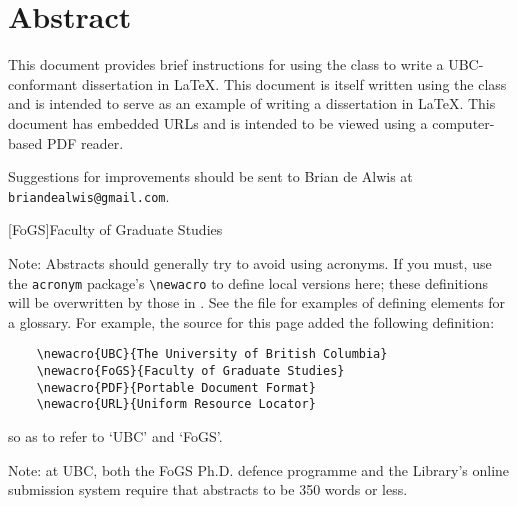 \chapter{Abstract}

This document provides brief instructions for using the 
class to write a \acs{UBC}-conformant dissertation in \LaTeX.  This
document is itself written using the  class and is
intended to serve as an example of writing a dissertation in \LaTeX.
This document has embedded \acp{URL} and is intended to be viewed
using a computer-based \ac{PDF} reader.

Suggestions for improvements should be sent to Brian de Alwis at
\texttt{briandealwis@gmail.com}.

[FoGS]{Faculty of Graduate Studies}

Note: Abstracts should generally try to avoid using acronyms.  If you
must, use the \verb+acronym+ package's \verb+\newacro+ to define
local versions here; these definitions will be overwritten by those
in .  See the  file for
examples of defining elements for a glossary.
For example, the source for this page added the following definition:
\begin{verbatim}
    \newacro{UBC}{The University of British Columbia}
    \newacro{FoGS}{Faculty of Graduate Studies}
    \newacro{PDF}{Portable Document Format}
    \newacro{URL}{Uniform Resource Locator}
\end{verbatim}
so as to refer to `\ac{UBC}' and `\ac{FoGS}'.

Note: at \ac{UBC}, both the \ac{FoGS} Ph.D. defence programme and the
Library's online submission system require that abstracts to be 350
words or less.

\vfill
\begin{center}
\begin{sf}
\end{sf}
\end{center}
